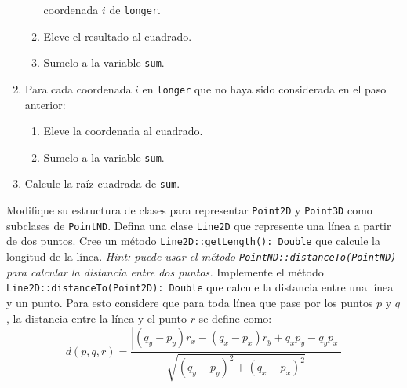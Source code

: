 \begin{Exercise}[title={Puntos en el espacio}, label={oop:principios:ejercicios:puntos}]
\begin{enumerate}
\begin{enumerate}
              coordenada \(i\) de \texttt{longer}.
            \item Eleve el resultado al cuadrado.
            \item Sumelo a la variable \texttt{sum}.
          \end{enumerate}
        \item Para cada coordenada \(i\) en \texttt{longer} que no haya sido considerada en el paso 
          anterior:
          \begin{enumerate}
            \item Eleve la coordenada al cuadrado.
            \item Sumelo a la variable \texttt{sum}.
          \end{enumerate}
        \item Calcule la raíz cuadrada de \texttt{sum}.
      \end{enumerate}
    \Question Modifique su estructura de clases para representar \texttt{Point2D} y \texttt{Point3D} 
      como subclases de \texttt{PointND}.
    \Question Defina una clase \texttt{Line2D} que represente una línea a partir de dos puntos.
    \Question Cree un método \texttt{Line2D::getLength(): Double} que calcule la longitud de la 
      línea.
      \textit{Hint: puede usar el método \texttt{PointND::distanceTo(PointND)} para calcular la
      distancia entre dos puntos.}
    \Question Implemente el método \texttt{Line2D::distanceTo(Point2D): Double} que calcule la 
      distancia entre una línea y un punto.
      Para esto considere que para toda línea que pase por los puntos \(p\) y \(q\), la distancia
      entre la línea y el punto \(r\) se define como:
      \[
        d(p, q, r) = \frac{
          |(q_y - p_y)r_x - (q_x - p_x)r_y + q_xp_y - q_yp_x|
        }{
          \sqrt{(q_y - p_y)^2 + (q_x - p_x)^2}
        }
      \]
  \end{Exercise}

